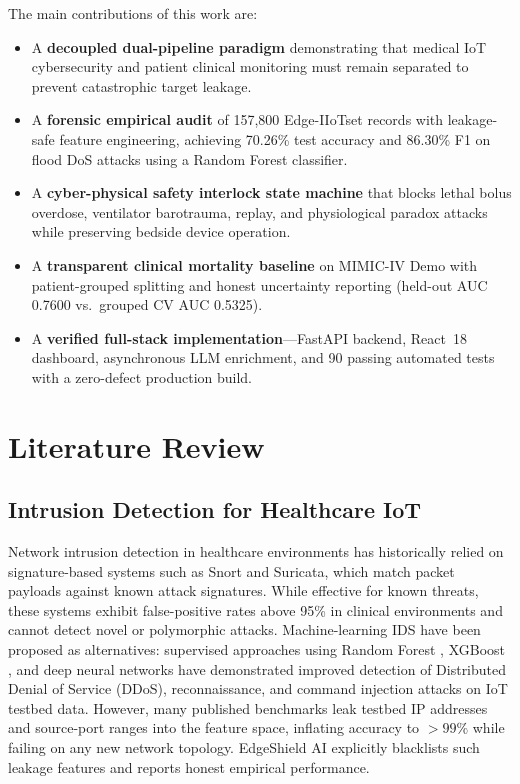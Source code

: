 \documentclass[conference]{IEEEtran}
\begin{document}
The main contributions of this work are:
\begin{itemize}
    \item A \textbf{decoupled dual-pipeline paradigm} demonstrating that medical IoT cybersecurity and patient clinical monitoring must remain separated to prevent catastrophic target leakage.
    \item A \textbf{forensic empirical audit} of 157,800 Edge-IIoTset records with leakage-safe feature engineering, achieving 70.26\% test accuracy and 86.30\% F1 on flood DoS attacks using a Random Forest classifier.
    \item A \textbf{cyber-physical safety interlock state machine} that blocks lethal bolus overdose, ventilator barotrauma, replay, and physiological paradox attacks while preserving bedside device operation.
    \item A \textbf{transparent clinical mortality baseline} on MIMIC-IV Demo with patient-grouped splitting and honest uncertainty reporting (held-out AUC 0.7600 vs.\ grouped CV AUC 0.5325).
    \item A \textbf{verified full-stack implementation}---FastAPI backend, React~18 dashboard, asynchronous LLM enrichment, and 90 passing automated tests with a zero-defect production build.
\end{itemize}

\section{Literature Review}

\subsection{Intrusion Detection for Healthcare IoT}
Network intrusion detection in healthcare environments has historically relied on signature-based systems such as Snort \cite{snort} and Suricata, which match packet payloads against known attack signatures. While effective for known threats, these systems exhibit false-positive rates above 95\% in clinical environments and cannot detect novel or polymorphic attacks. Machine-learning IDS have been proposed as alternatives: supervised approaches using Random Forest \cite{rf}, XGBoost \cite{xgboost}, and deep neural networks have demonstrated improved detection of Distributed Denial of Service (DDoS), reconnaissance, and command injection attacks on IoT testbed data. However, many published benchmarks leak testbed IP addresses and source-port ranges into the feature space, inflating accuracy to $>99\%$ while failing on any new network topology. EdgeShield AI explicitly blacklists such leakage features and reports honest empirical performance.
\end{document}
